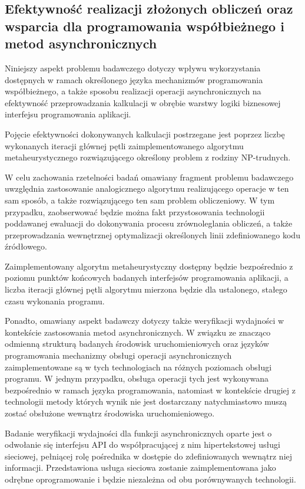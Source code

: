 \subsection*{Efektywność realizacji złożonych obliczeń oraz wsparcia dla programowania współbieżnego i metod asynchronicznych}
Niniejszy aspekt problemu badawczego dotyczy wpływu wykorzystania dostępnych w ramach określonego języka mechanizmów programowania współbieżnego, a także sposobu realizacji operacji asynchronicznych na efektywność przeprowadzania kalkulacji w obrębie warstwy logiki biznesowej interfejsu programowania aplikacji.

Pojęcie efektywności dokonywanych kalkulacji postrzegane jest poprzez liczbę wykonanych iteracji głównej pętli zaimplementowanego algorytmu metaheurystycznego rozwiązującego określony problem z rodziny NP-trudnych.

W celu zachowania rzetelności badań omawiany fragment problemu badawczego uwzględnia zastosowanie analogicznego algorytmu realizującego operacje w ten sam sposób, a także rozwiązującego ten sam problem obliczeniowy. W tym przypadku, zaobserwować będzie można fakt przystosowania technologii poddawanej ewaluacji do dokonywania procesu zrównoleglania obliczeń, a także przeprowadzania wewnętrznej optymalizacji określonych linii zdefiniowanego kodu źródłowego.

Zaimplementowany algorytm metaheurystyczny dostępny będzie bezpośrednio z poziomu punktów końcowych badanych interfejsów programowania aplikacji, a liczba iteracji głównej pętli algorytmu mierzona będzie dla ustalonego, stałego czasu wykonania programu.

Ponadto, omawiany aspekt badawczy dotyczy także weryfikacji wydajności w kontekście zastosowania metod asynchronicznych. W związku ze znacząco odmienną strukturą badanych środowisk uruchomieniowych oraz języków programowania mechanizmy obsługi operacji asynchronicznych zaimplementowane są w tych technologiach na różnych poziomach obsługi programu. W jednym przypadku, obsługa operacji tych jest wykonywana bezpośrednio w ramach języka programowania, natomiast w kontekście drugiej z technologii metody których wynik nie jest dostarczany natychmiastowo muszą zostać obsłużone wewnątrz środowiska uruchomieniowego.

Badanie weryfikacji wydajności dla funkcji asynchronicznych oparte jest o odwołanie się interfejsu API do współpracującej z nim hipertekstowej usługi sieciowej, pełniącej rolę pośrednika w dostępie do zdefiniowanych wewnątrz niej informacji. Przedstawiona usługa sieciowa zostanie zaimplementowana jako odrębne oprogramowanie i będzie niezależna od obu porównywanych technologii.

